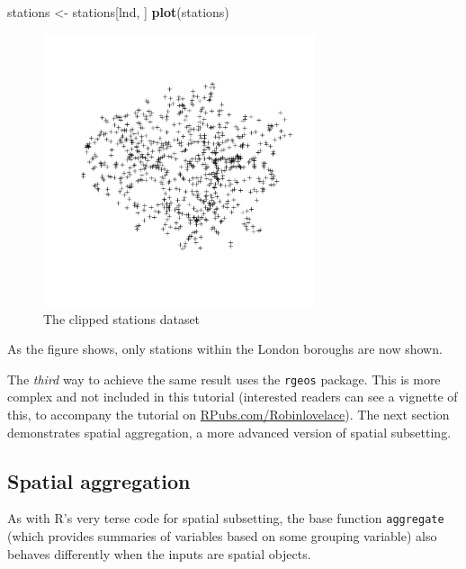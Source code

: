 \documentclass[]{article}
\newenvironment{Shaded}{}{}
\newcommand{\KeywordTok}[1]{\textcolor[rgb]{0.00,0.44,0.13}{\textbf{{#1}}}}
\newcommand{\NormalTok}[1]{{#1}}
\let\Oldincludegraphics\includegraphics
\renewcommand{\includegraphics}[1]{\Oldincludegraphics[width=8cm]{#1}}
\begin{document}
\begin{Shaded}
\begin{Highlighting}[]
\NormalTok{stations <- stations[lnd, ]}
\KeywordTok{plot}\NormalTok{(stations)}
\end{Highlighting}
\end{Shaded}
\begin{figure}[htbp]
\centering
\includegraphics{figure/The_clipped_stations_dataset.png}
\caption{The clipped stations dataset}
\end{figure}

As the figure shows, only stations within the London boroughs are now
shown.

The \emph{third} way to achieve the same result uses the \texttt{rgeos}
package. This is more complex and not included in this tutorial
(interested readers can see a vignette of this, to accompany the
tutorial on
\href{http://rpubs.com/RobinLovelace/11796}{RPubs.com/Robinlovelace}).
The next section demonstrates spatial aggregation, a more advanced
version of spatial subsetting.

\subsection{Spatial aggregation}

As with R's very terse code for spatial subsetting, the base function
\texttt{aggregate} (which provides summaries of variables based on some
grouping variable) also behaves differently when the inputs are spatial
objects.
\end{document}
